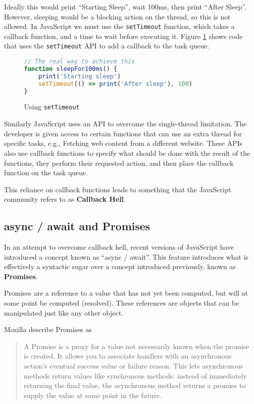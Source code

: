 Ideally this would print ``Starting Sleep'', wait 100ms, then print ``After Sleep''. However, sleeping would be a blocking action on the thread, so this is not allowed. In JavaScript we must use the \texttt{setTimeout} function, which takes a callback function, and a time to wait before executing it. Figure \ref{setTimeoutCode} shows code that uses the \texttt{setTimeout} API to add a callback to the task queue.

\begin{figure}
    \caption{Using \texttt{setTimeout}}
    \label{setTimeoutCode}
    \begin{lstlisting}[language=javascript]
// The real way to achieve this
function sleepFor100ms() {
    print('Starting sleep')
    setTimeout(() => print('After sleep'), 100)
}
    \end{lstlisting}
\end{figure}

Similarly JavaScript uses an API to overcome the single-thread limitation. The developer is given access to certain functions that can use an extra thread for specific tasks, e.g., Fetching web content from a different website. These APIs also use callback functions to specify what should be done with the result of the functions, they perform their requested action, and then place the callback function on the task queue.

This reliance on callback functions leads to something that the JavaScript community refers to as \textbf{Callback Hell}\cite{callbackhell}.

\subsection{async / await and Promises}\label{background:asyncawait}

In an attempt to overcome callback hell, recent versions of JavaScript have introduced a concept known as ``async / await''.\cite{es8spec} This feature introduces what is effectively a syntactic sugar over a concept introduced previously, known as \textbf{Promises}.

Promises are a reference to a value that has not yet been computed, but will at some point be computed (resolved). These references are objects that can be manipulated just like any other object.

Mozilla describe Promises as
\begin{quote}
A Promise is a proxy for a value not necessarily known when the promise is created. It allows you to associate handlers with an asynchronous action's eventual success value or failure reason. This lets asynchronous methods return values like synchronous methods: instead of immediately returning the final value, the asynchronous method returns a promise to supply the value at some point in the future.
    \cite{mozillapromises}
\end{quote}


